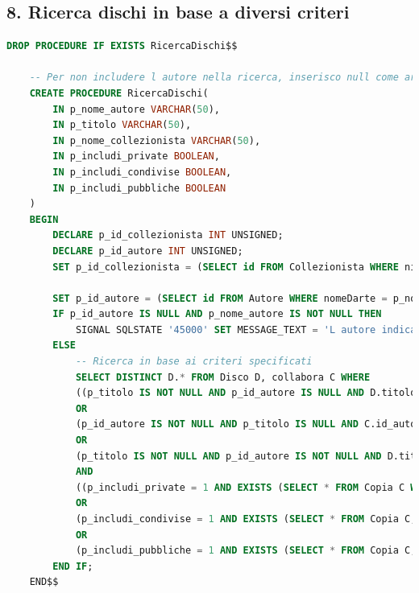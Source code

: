 \documentclass{article}
\begin{document}
\subsection*{8. Ricerca dischi in base a diversi criteri}
\begin{lstlisting}[language=SQL]
    DROP PROCEDURE IF EXISTS RicercaDischi$$
    
    -- Per non includere l autore nella ricerca, inserisco null come argomento dell'autore. Stesso discorso per il titolo.
    CREATE PROCEDURE RicercaDischi(
        IN p_nome_autore VARCHAR(50),
        IN p_titolo VARCHAR(50),
        IN p_nome_collezionista VARCHAR(50),
        IN p_includi_private BOOLEAN,
        IN p_includi_condivise BOOLEAN,
        IN p_includi_pubbliche BOOLEAN
    )
    BEGIN
        DECLARE p_id_collezionista INT UNSIGNED;
        DECLARE p_id_autore INT UNSIGNED;
        SET p_id_collezionista = (SELECT id FROM Collezionista WHERE nickname = p_nome_collezionista);
    
        SET p_id_autore = (SELECT id FROM Autore WHERE nomeDarte = p_nome_autore);
        IF p_id_autore IS NULL AND p_nome_autore IS NOT NULL THEN 
            SIGNAL SQLSTATE '45000' SET MESSAGE_TEXT = 'L autore indicato non esiste';
        ELSE
            -- Ricerca in base ai criteri specificati 
            SELECT DISTINCT D.* FROM Disco D, collabora C WHERE 
            ((p_titolo IS NOT NULL AND p_id_autore IS NULL AND D.titolo LIKE CONCAT('%', p_titolo, '%')) 
            OR 
            (p_id_autore IS NOT NULL AND p_titolo IS NULL AND C.id_autore = p_id_autore AND D.id = C.id_disco) 
            OR 
            (p_titolo IS NOT NULL AND p_id_autore IS NOT NULL AND D.titolo LIKE CONCAT('%', p_titolo, '%') AND C.id_autore = p_id_autore AND D.id = C.id_disco))
            AND 
            ((p_includi_private = 1 AND EXISTS (SELECT * FROM Copia C WHERE C.id_disco = D.id AND C.id_collezione IN (SELECT id FROM Collezione WHERE id_collezionista = p_id_collezionista)))
            OR 
            (p_includi_condivise = 1 AND EXISTS (SELECT * FROM Copia C, Condivide CC WHERE C.id_disco = D.id AND C.id_collezione = CC.id_collezione AND CC.id_collezionista = p_id_collezionista))
            OR 
            (p_includi_pubbliche = 1 AND EXISTS (SELECT * FROM Copia C, Collezione CZ WHERE C.id_disco = D.id AND C.id_collezione = CZ.id AND CZ.isPubblica = 1 AND CZ.id_collezionista != p_id_collezionista))); -- escludo le collezioni pubbliche che appartengono al collezionista che fa la query
        END IF;
    END$$
\end{lstlisting}
\end{document}
